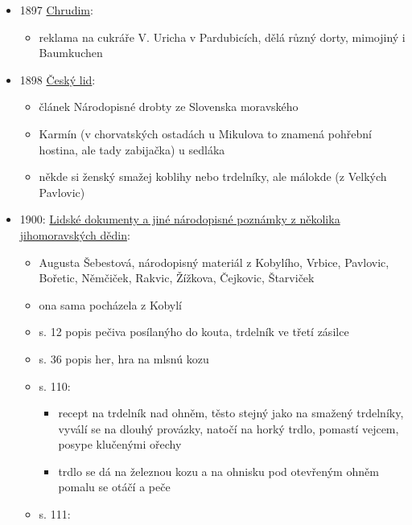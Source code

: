 \begin{itemize}
  \begin{itemize}
  \tightlist
  \item
    školní zkoušky v Křižanovicích u Slavkova, za odměnu byly slavnosti
    se spoustou jídla, i trdelníky
  \end{itemize}
\item
  1897
  \href{https://ceskadigitalniknihovna.cz/uuid/uuid:c3a426e0-2b81-11e7-a77b-001018b5eb5c}{Chrudim}:

  \begin{itemize}
  \tightlist
  \item
    reklama na cukráře V. Uricha v Pardubicích, dělá různý dorty,
    mimojiný i Baumkuchen
  \end{itemize}
\item
  1898
  \href{https://ceskadigitalniknihovna.cz/view/uuid:38bef4ba-03a2-433c-a4ed-a9914d68b1a5?page=uuid\%3A5c5ae01f-9a43-4111-b72b-1cfe6710f70a&fulltext=trdeln\%C3\%ADk\%20OR\%20trdeln\%C3\%ADky\%20OR\%20trdeln\%C3\%ADk\%C5\%AF&source=knav}{Český
  lid}:

  \begin{itemize}
  \tightlist
  \item
    článek Národopisné drobty ze Slovenska moravského
  \item
    Karmín (v chorvatských ostadách u Mikulova to znamená pohřební
    hostina, ale tady zabijačka) u sedláka
  \item
    někde si ženský smažej koblihy nebo trdelníky, ale málokde (z
    Velkých Pavlovic)
  \end{itemize}
\item
  1900:
  \href{https://ndk.cz/view/uuid:7d517d10-0583-11dd-85d4-000d606f5dc6?page=uuid\%3A445fd636-253c-4b04-b533-3b0a96e7e0b4}{Lidské
  dokumenty a jiné národopisné poznámky z několika jihomoravských
  dědin}:

  \begin{itemize}
  \tightlist
  \item
    Augusta Šebestová, národopisný materiál z Kobylího, Vrbice,
    Pavlovic, Bořetic, Němčiček, Rakvic, Žížkova, Čejkovic, Štarviček
  \item
    ona sama pocházela z Kobylí
  \item
    s. 12 popis pečiva posílanýho do kouta, trdelník ve třetí zásilce
  \item
    s. 36 popis her, hra na mlsnú kozu
  \item
    s. 110:

    \begin{itemize}
    \tightlist
    \item
      recept na trdelník nad ohněm, těsto stejný jako na smažený
      trdelníky, vyválí se na dlouhý provázky, natočí na horký trdlo,
      pomastí vejcem, posype klučenými ořechy
    \item
      trdlo se dá na železnou kozu a na ohnisku pod otevřeným ohněm
      pomalu se otáčí a peče
    \end{itemize}
  \item
    s. 111:


\end{itemize}
\end{itemize}
